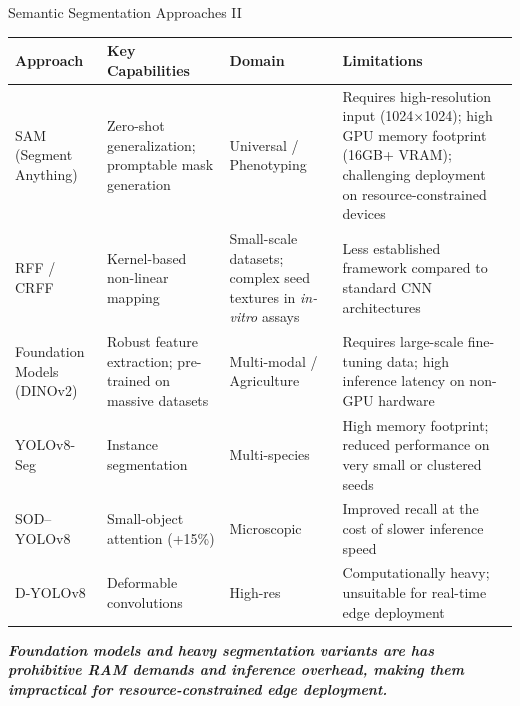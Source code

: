 \documentclass[aspectratio=169]{beamer}
\let\oldcite\cite %
\renewcommand{\cite}[1]{{\tiny\oldcite{#1}}}
\begin{document}
\begin{frame}{Semantic Segmentation Approaches II}
    \begin{table}[H]
    \centering
    \tiny
    \setlength{\tabcolsep}{2pt}
    \begin{tabular}{@{}p{3cm}p{2.6cm}p{2cm}p{3.5cm}@{}}
    \toprule
    \textbf{Approach} & \textbf{Key Capabilities} & \textbf{Domain} & \textbf{Limitations} \\
    \midrule
    SAM (Segment Anything) \cite{kirillov2023segment} &
    Zero-shot generalization; promptable mask generation &
    Universal / Phenotyping &
    Requires high-resolution input (1024$\times$1024); high GPU memory footprint (16GB+ VRAM); challenging deployment on resource-constrained devices \cite{wu2023medical} \\
    \addlinespace[2pt]
    RFF / CRFF \cite{aguirre2023deep}&
    Kernel-based non-linear mapping \cite{jimenez2021random} &
    Small-scale datasets; complex seed textures in \textit{in-vitro} assays &
    Less established framework compared to standard CNN architectures \cite{bietti2021approximation} \\ 
    \addlinespace[2pt]
    Foundation Models (DINOv2) \cite{oquab2023dinov2} &
    Robust feature extraction; pre-trained on massive datasets &
    Multi-modal / Agriculture &
    Requires large-scale fine-tuning data; high inference latency on non-GPU hardware \\
    \addlinespace[2pt]
    YOLOv8-Seg \cite{yu2025vt_yolov8_seg} &
    Instance segmentation &
    Multi-species &
    High memory footprint; reduced performance on very small or clustered seeds \cite{iet2024yolo} \\
    \addlinespace[2pt]
    SOD--YOLOv8 \cite{chen2024sod_yolov8} &
    Small-object attention (+15\%) &
    Microscopic &
    Improved recall at the cost of slower inference speed \\
    \addlinespace[2pt]
    D-YOLOv8 \cite{wang2024dyolov8} &
    Deformable convolutions &
    High-res &
    Computationally heavy; unsuitable for real-time edge deployment \\
    \bottomrule
    \end{tabular}
    \end{table}
    
    \vspace{0.3cm}
    \small
    \textit{\textbf{Foundation models and heavy segmentation variants are has prohibitive RAM demands and inference overhead, making them impractical for resource-constrained edge deployment.}}
\end{frame}
\end{document}
